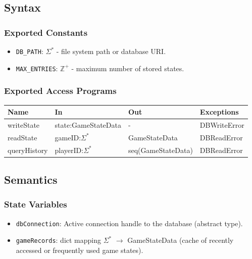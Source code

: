 \documentclass[12pt, titlepage]{article}
\begin{document}
\subsection{Syntax}

\subsubsection{Exported Constants}
\begin{itemize}
\item \texttt{DB\_PATH}: $\Sigma^{*}$ - file system path or database URI.
\item \texttt{MAX\_ENTRIES}: $\mathbb{Z}^{+}$ - maximum number of stored states.
\end{itemize}

\subsubsection{Exported Access Programs}
\begin{center}
\begin{tabular}{p{5cm} p{4cm} p{4cm} p{3cm}}
\hline
\textbf{Name} & \textbf{In} & \textbf{Out} & \textbf{Exceptions} \\
\hline
writeState & state:GameStateData & - & DBWriteError \\
readState & gameID:$\Sigma^{*}$ & GameStateData & DBReadError \\
queryHistory & playerID:$\Sigma^{*}$ & seq(GameStateData) & DBReadError \\
\hline
\end{tabular}
\end{center}

\subsection{Semantics}

\subsubsection{State Variables}
\begin{itemize}
\item \texttt{dbConnection}: Active connection handle to the database (abstract type).
\item \texttt{gameRecords}: dict mapping $\Sigma^{*}$ $\rightarrow$ GameStateData  
      (cache of recently accessed or frequently used game states).
\end{itemize}
\end{document}
